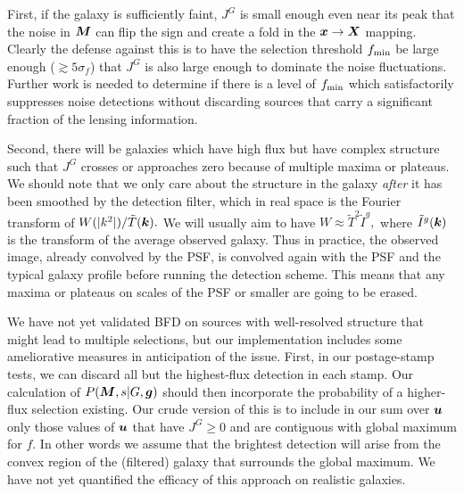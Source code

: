 \documentclass[11pt,preprint,flushrt]{aastex}
\newcommand{\vecX}{\mbox{\boldmath $X$}}
\newcommand{\vecg}{\mbox{\boldmath $g$}}
\newcommand{\vecM}{\mbox{\boldmath $M$}}
\newcommand{\vecx}{\mbox{\boldmath $x$}}
\newcommand{\veck}{\mbox{\boldmath $k$}}
\newcommand{\vecu}{\mbox{\boldmath $u$}}
\begin{document}
First, if the galaxy is sufficiently faint, $J^G$ is small enough even
near its peak that the noise in $\vecM$ can flip the sign and create
a fold in the $\vecx\rightarrow\vecX$ mapping. Clearly the defense against this is to
have the selection threshold $f_{\rm min}$ be large enough
($\gtrsim5\sigma_f$) that $J^G$ is also large enough to dominate the
noise fluctuations.  Further work is needed to determine if there is a
level of $f_{\rm min}$ which satisfactorily suppresses noise detections
without discarding sources that carry a significant fraction of the
lensing information.

Second, there will be galaxies which have high flux but have complex
structure such that $J^G$ crosses or approaches zero because of
multiple maxima or plateaus.   We should note that we only
care about the structure in the galaxy \emph{after} it has been
smoothed by the detection filter, which in real space is the Fourier
transform of $W(|k^2|)/\tilde T(\veck).$  We will usually aim to have
$W\approx \tilde T^2 \tilde I^g,$ where $\tilde I^g(\veck)$ is the transform
of the average observed galaxy.  Thus in practice, the observed image,
already convolved by the PSF, is convolved again with the PSF and the
typical galaxy profile before running the detection scheme.  This
means that any maxima or plateaus on scales of the PSF or smaller are
going to be erased.

We have not yet validated BFD on sources
with well-resolved structure that might lead to multiple selections,
but our implementation includes some ameliorative 
measures in anticipation of the issue.  First, in our postage-stamp
tests, we can discard all but the highest-flux detection in each
stamp.  Our calculation of $P(\vecM,s|G, \vecg)$ should then incorporate the
probability of a higher-flux selection existing.  Our crude version of
this is to include in our sum over $\vecu$ only those values of $\vecu$
that have $J^G\ge0$ and are contiguous with global maximum for $f$.
In other words we assume that the brightest detection will arise from
the convex region of the (filtered) galaxy that surrounds the global
maximum.  We have not yet quantified the efficacy of this approach on
realistic galaxies.
\end{document}
